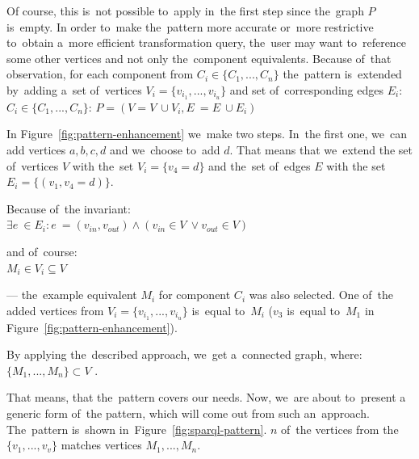 Of course, this is~not possible to~apply in~the first step since the~graph $P$ is~empty. 
In order to~make the~pattern more accurate or~more restrictive to~obtain a~more 
efficient transformation query, the~user may want to~reference some other 
vertices and not only the~component equivalents.
Because of~that observation, for each component from $C_i \in \{C_1 ,..., C_n\}$ the~pattern is~extended by~adding a~set of~vertices $V_i = \{v_{i_1}, ..., v_{i_u}\}$ and set of~corresponding edges 
$E_i$:\\

{\centering \forall $C_i \in \{C_1 ,..., C_n\}$: $P = (V = V~\cup V_i, E~= E~\cup E_i)$ \\[0.5cm]}

In Figure~\ref{fig:pattern-enhancement} we~make two steps. In~the first one, we~can add vertices $a,b,c,d$ and we~choose to~add $d$. That means that we~extend 
the set of~vertices $V$ with the~set $V_i = \{v_4 = d\}$ and the~set of~edges $E$ with 
the set $E_i = \{(v_1,v_4 = d)\}$.

Because of~the invariant:\\

{\centering $\exists e~\in E_i: e~= (v_{in}, v_{out}) \land (v_{in} \in V~\lor v_{out} \in V)$\\[0.5cm]}

and of~course:\\

{\centering $M_i \in V_i \subseteq V$ \\[0.5cm]}

--- the~example equivalent $M_i$ for component $C_i$ was also selected. One of~the 
added vertices from $V_i = \{v_{i_1}, ..., v_{i_u}\}$ is~equal to~$M_i$ ($v_3$ is~equal to~$M_1$
in Figure~\ref{fig:pattern-enhancement}).
   
By applying the~described approach, we~get a~connected graph, where:\\

{\centering $\{M_1, ..., M_n\} \subset V$ .\\[0.5cm]}

That means, that the~pattern covers our needs. Now, we~are about to~present
a generic form of~the pattern, which will come out from 
such an~approach. The~pattern is~shown in~Figure~\ref{fig:sparql-pattern}. 
$n$ of~the vertices from the~$\{v_1, ..., v_v\}$ matches vertices $M_1, ..., M_n$.

